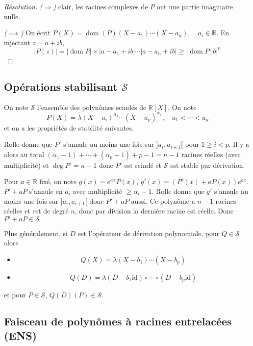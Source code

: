 \documentclass{article}
\theoremstyle{definition}
\DeclareMathOperator{\dom}{dom}
\begin{document}
\begin{proof}[Résolution]
    \emph{($\Longrightarrow$)} clair, les racines complexes de $P$ ont une partie imaginaire nulle.

     \emph{($\implies$)} On écrit $P(X)=\dom(P)(X-a_1)\cdots (X-a_n), \quad a_i\in\mathbb R$. En injectant $z=a+ib$, \[
        |P(z)|=|\dom P|\times |a-a_1+ib| \cdots |a-a_n+ib|\geq |\dom P| |b|^n
    \]
\end{proof}

\subsection{Opérations stabilisant $\mathcal S$}

On note $\mathcal S$ l'ensemble des polynômes scindés de $\mathbb R[X]$. On note \[
    P(X)=\lambda (X-a_i)^{\alpha_1}\cdots (X-a_p)^{\alpha_p}, \quad a_1<\cdots <a_p
\]
et on a les propriétés de stabilité suivantes.

\vspace{.2cm}

 Rolle donne que $P'$ s'annule au moins une fois sur $]a_i, a_{i+1}[$ pour $1\geq i < p$. Il y a alors au total $(\alpha_1-1)+\cdots+(\alpha_p-1)+p-1=n-1$ racines réelles (avec multiplicité) et $\deg P'=n-1$ donc $P'$ est scindé et $\mathcal S$ est stable par dérivation.

\vspace{.2cm}

 Pour $a\in\mathbb R$ fixé, on note $g(x)=e^{ax}P(x)$, $g'(x)=(P'(x)+aP(x))e^{ax}$. $P'+aP$ s'annule en $a_i$ avec multiplicité $\geq \alpha_i-1$. Rolle donne que $g'$ s'annule au moins une fois sur $]a_i, a_{i+1}[$ donc $P'+aP$ aussi. Ce polynôme a $n-1$ racines réelles et est de degré $n$, donc par division la dernière racine est réelle. Donc $P'+aP\in\mathcal S$

\vspace{.2cm}

 Plus généralement, si $D$ est l'opérateur de dérivation polynomiale, pour $Q\in\mathcal S$ alors
\begin{itemize}
    \item
\[
    Q(X)=\lambda (X-b_1)\cdots (X-b_p)
\]
\item \[
        Q(D)=\lambda(D-b_1\mathrm{id})\circ \cdots \circ (D-b_p \mathrm{id})
    \]
\end{itemize}
et pour $P\in\mathcal S$, $Q(D)(P)\in\mathcal S$.

\subsection{Faisceau de polynômes à racines entrelacées (ENS)}
\end{document}
